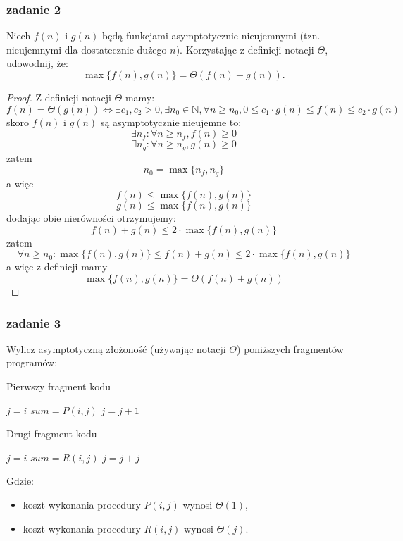 \documentclass[11pt,a4paper]{article}
\begin{document}
\subsubsection{zadanie 2}
Niech $f(n)$ i $g(n)$ będą funkcjami asymptotycznie nieujemnymi (tzn. nieujemnymi dla dostatecznie dużego $n$). Korzystając z definicji notacji $\Theta$, udowodnij, że:
\[
\max\{f(n), g(n)\} = \Theta(f(n) + g(n)).
\]
\begin{proof}
    Z definicji notacji $\Theta$ mamy:
    \[
        f(n)=\Theta(g(n)) \iff \exists c_1, c_2 > 0, \exists n_0 \in \mathbb{N}, \forall n \geq n_0, 0 \leq c_1 \cdot g(n) \leq f(n) \leq c_2 \cdot g(n)
    \]
    skoro $f(n)$ i $g(n)$ są asymptotycznie nieujemne to:
    \[
        \exists n_f: \forall n \geq n_f, f(n) \geq 0
    \]
    \[
        \exists n_g: \forall n \geq n_g, g(n) \geq 0
    \]
    zatem
    \[
        n_0=\max\{n_f, n_g\}
    \]
    a więc
    \[
        f(n) \leq \max\{f(n), g(n)\}
    \]
    \[
        g(n) \leq \max\{f(n), g(n)\}
    \]
    dodając obie nierówności otrzymujemy:
    \[
        f(n) + g(n) \leq 2 \cdot \max\{f(n), g(n)\}
    \]
    zatem
    \[
        \forall n \geq n_0: \max\{f(n), g(n)\} \leq f(n) + g(n) \leq 2 \cdot \max\{f(n), g(n)\}
    \]
    a więc z definicji mamy
    \[
        \max\{f(n), g(n)\} = \Theta(f(n) + g(n))
    \]
\end{proof}

\subsubsection{zadanie 3}
Wylicz asymptotyczną złożoność (używając notacji $\Theta$) poniższych fragmentów programów:

\begin{algorithm}
\caption{Pierwszy fragment kodu}
\begin{algorithmic}[1]
    \State $j = i$
        \State $sum = P(i, j)$
        \State $j = j + 1$
    \EndWhile
\EndFor
\end{algorithmic}
\end{algorithm}

\begin{algorithm}
\caption{Drugi fragment kodu}
\begin{algorithmic}[1]
    \State $j = i$
        \State $sum = R(i, j)$
        \State $j = j + j$
    \EndWhile
\EndFor
\end{algorithmic}
\end{algorithm}
Gdzie:
\begin{itemize}
    \item koszt wykonania procedury $P(i,j)$ wynosi $\Theta(1)$,
    \item koszt wykonania procedury $R(i,j)$ wynosi $\Theta(j)$.
\end{itemize}
\end{document}
